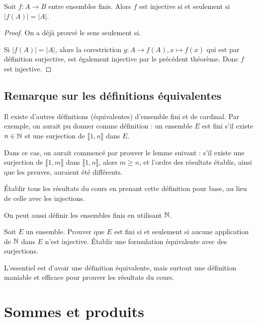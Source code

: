 \begin{corollaire}
Soit $f : A\to B$ entre ensembles finis. Alors $f$ est injective si et seulement si $|f(A)|=|A|$.
\end{corollaire}
\begin{proof}On a déjà prouvé le sens \og seulement si\fg.

Si $|f(A)|=|A|$, alors la corestriction $g : A\to f(A), x\mapsto f(x)$ qui est par définition surjective, est également injective par le précédent théorème. Donc $f$ est injective.
\end{proof}



\subsection{Remarque sur les définitions équivalentes}

Il existe d'autres définitions (équivalentes) d'ensemble fini et de cardinal.
Par exemple, on aurait pu donner comme définition  : un ensemble $E$ est fini s'il existe $n\in \mathbb{N}$ et une surjection de $\llbracket 1,n\rrbracket$ dans $E$.

Dans ce cas, on aurait commencé par prouver le lemme suivant : \og s'il existe une surjection de $\llbracket 1,m\rrbracket$ dans $\llbracket 1,n\rrbracket$, alors $m\geq n$\fg, et l'ordre des résultats établis, ainsi que les preuves, auraient été différents.

\begin{exercice} \'Etablir tous les résultats du cours en prenant  cette définition pour base, au lieu de celle avec les injections.
\end{exercice}

On peut aussi définir les ensembles finis en utilisant $\mathbb{N}$.

\begin{exercice}
Soit $E$ un ensemble.
Prouver que $E$ est fini si et seulement si aucune application de $\mathbb{N}$ dans $E$ n'est injective.
\'Etablir une formulation équivalente avec des surjections.
\end{exercice}

L'essentiel est d'avoir une définition équivalente, mais surtout une définition maniable et efficace pour prouver les résultats du cours.

\section{Sommes et produits}

